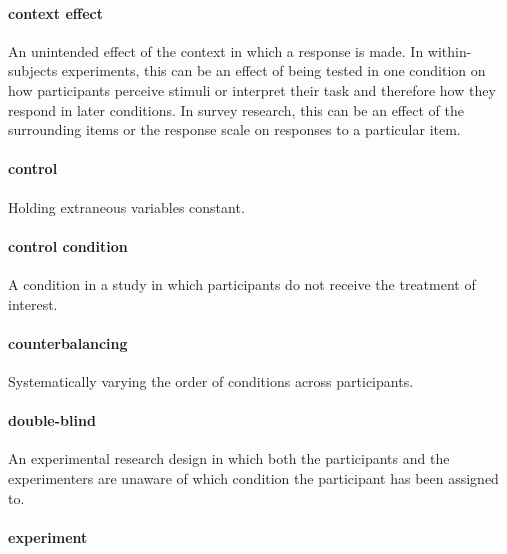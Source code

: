 \documentclass[
]{krantz}
\begin{document}
\hypertarget{context-effect}{%
\paragraph*{context effect}\label{context-effect}}

An unintended effect of the context in which a response is made. In within-subjects experiments, this can be an effect of being tested in one condition on how participants perceive stimuli or interpret their task and therefore how they respond in later conditions. In survey research, this can be an effect of the surrounding items or the response scale on responses to a particular item.

\hypertarget{control}{%
\paragraph*{control}\label{control}}

Holding extraneous variables constant.

\hypertarget{control-condition}{%
\paragraph*{control condition}\label{control-condition}}

A condition in a study in which participants do not receive the treatment of interest.

\hypertarget{counterbalancing}{%
\paragraph*{counterbalancing}\label{counterbalancing}}

Systematically varying the order of conditions across participants.

\hypertarget{double-blind}{%
\paragraph*{double-blind}\label{double-blind}}

An experimental research design in which both the participants and the experimenters are unaware of which condition the participant has been assigned to.

\hypertarget{experiment-1}{%
\paragraph*{experiment}\label{experiment-1}}
\end{document}
